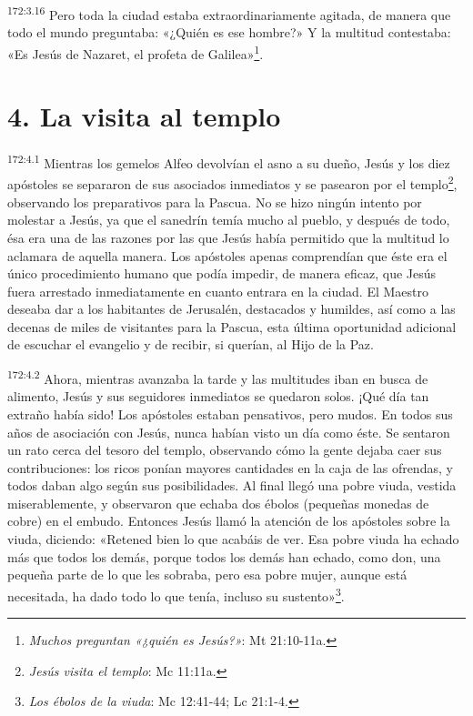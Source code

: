 \par
\textsuperscript{172:3.16} Pero toda la ciudad estaba extraordinariamente agitada, de manera que todo el mundo preguntaba: «¿Quién es ese hombre?» Y la multitud contestaba: «Es Jesús de Nazaret, el profeta de Galilea»\footnote{\textit{Muchos preguntan «¿quién es Jesús?»}: Mt 21:10-11a.}.

\section*{4. La visita al templo}
\par
\textsuperscript{172:4.1} Mientras los gemelos Alfeo devolvían el asno a su dueño, Jesús y los diez apóstoles se separaron de sus asociados inmediatos y se pasearon por el templo\footnote{\textit{Jesús visita el templo}: Mc 11:11a.}, observando los preparativos para la Pascua. No se hizo ningún intento por molestar a Jesús, ya que el sanedrín temía mucho al pueblo, y después de todo, ésa era una de las razones por las que Jesús había permitido que la multitud lo aclamara de aquella manera. Los apóstoles apenas comprendían que éste era el único procedimiento humano que podía impedir, de manera eficaz, que Jesús fuera arrestado inmediatamente en cuanto entrara en la ciudad. El Maestro deseaba dar a los habitantes de Jerusalén, destacados y humildes, así como a las decenas de miles de visitantes para la Pascua, esta última oportunidad adicional de escuchar el evangelio y de recibir, si querían, al Hijo de la Paz.

\par
\textsuperscript{172:4.2} Ahora, mientras avanzaba la tarde y las multitudes iban en busca de alimento, Jesús y sus seguidores inmediatos se quedaron solos. ¡Qué día tan extraño había sido! Los apóstoles estaban pensativos, pero mudos. En todos sus años de asociación con Jesús, nunca habían visto un día como éste. Se sentaron un rato cerca del tesoro del templo, observando cómo la gente dejaba caer sus contribuciones: los ricos ponían mayores cantidades en la caja de las ofrendas, y todos daban algo según sus posibilidades. Al final llegó una pobre viuda, vestida miserablemente, y observaron que echaba dos ébolos (pequeñas monedas de cobre) en el embudo. Entonces Jesús llamó la atención de los apóstoles sobre la viuda, diciendo: «Retened bien lo que acabáis de ver. Esa pobre viuda ha echado más que todos los demás, porque todos los demás han echado, como don, una pequeña parte de lo que les sobraba, pero esa pobre mujer, aunque está necesitada, ha dado todo lo que tenía, incluso su sustento»\footnote{\textit{Los ébolos de la viuda}: Mc 12:41-44; Lc 21:1-4.}.

